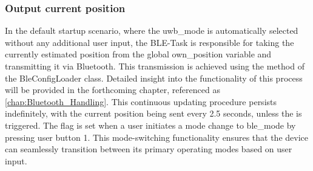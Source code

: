 \subsubsection{Output current position}
In the default startup scenario, where the uwb\_mode is automatically selected without any additional user input, the BLE-Task is responsible for taking the currently estimated position from the global own\_position variable and transmitting it via Bluetooth. 
This transmission is achieved using the  method of the BleConfigLoader class. Detailed insight into the functionality of this process will be provided in the forthcoming chapter, referenced as \ref{chap:Bluetooth_Handling}.
\vspace{4pt}
\newline
This continuous updating procedure persists indefinitely, with the current position being sent every 2.5 seconds, unless the  is triggered. 
The flag is set when a user initiates a mode change to ble\_mode by pressing user button 1.
\vspace{4pt}
\newline
This mode-switching functionality ensures that the device can seamlessly transition between its primary operating modes based on user input. 

